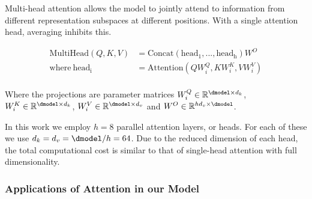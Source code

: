 Multi-head attention allows the model to jointly attend to information from different representation subspaces at different positions. With a single attention head, averaging inhibits this.

\begin{align*}
    \mathrm{MultiHead}(Q, K, V) &= \mathrm{Concat}(\mathrm{head_1}, ..., \mathrm{head_h})W^O\\
    \text{where}~\mathrm{head_i} &= \mathrm{Attention}(QW^Q_i, KW^K_i, VW^V_i)\\
\end{align*}

Where the projections are parameter matrices $W^Q_i \in \mathbb{R}^{\dmodel \times d_k}$, $W^K_i \in \mathbb{R}^{\dmodel \times d_k}$, $W^V_i \in \mathbb{R}^{\dmodel \times d_v}$ and $W^O \in \mathbb{R}^{hd_v \times \dmodel}$.



In this work we employ $h=8$ parallel attention layers, or heads. For each of these we use $d_k=d_v=\dmodel/h=64$.
Due to the reduced dimension of each head, the total computational cost is similar to that of single-head attention with full dimensionality.

\subsubsection{Applications of Attention in our Model}

